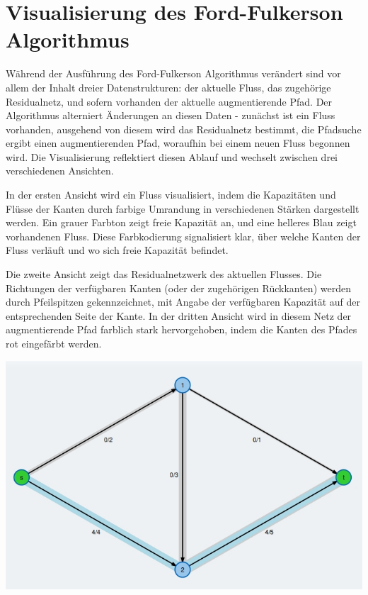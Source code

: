 \section{Visualisierung des Ford-Fulkerson Algorithmus}

Während der Ausführung des Ford-Fulkerson Algorithmus verändert sind vor allem der Inhalt dreier Datenstrukturen: der aktuelle Fluss, das zugehörige Residualnetz, und sofern vorhanden der aktuelle augmentierende Pfad. Der Algorithmus alterniert Änderungen an diesen Daten - zunächst ist ein Fluss vorhanden, ausgehend von diesem wird das Residualnetz bestimmt, die Pfadsuche ergibt einen augmentierenden Pfad, woraufhin bei einem neuen Fluss begonnen wird. Die Visualisierung reflektiert diesen Ablauf und wechselt zwischen drei verschiedenen Ansichten.

In der ersten Ansicht wird ein Fluss visualisiert, indem die Kapazitäten und Flüsse der Kanten durch farbige Umrandung in verschiedenen Stärken dargestellt werden. Ein grauer Farbton zeigt freie Kapazität an, und eine helleres Blau zeigt vorhandenen Fluss. Diese Farbkodierung signalisiert klar, über welche Kanten der Fluss verläuft und wo sich freie Kapazität befindet.

Die zweite Ansicht zeigt das Residualnetzwerk des aktuellen Flusses. Die Richtungen der verfügbaren Kanten (oder der zugehörigen Rückkanten) werden durch Pfeilspitzen gekennzeichnet, mit Angabe der verfügbaren Kapazität auf der entsprechenden Seite der Kante. In der dritten Ansicht wird in diesem Netz der augmentierende Pfad farblich stark hervorgehoben, indem die Kanten des Pfades rot eingefärbt werden.

\begin{center}
\begin{minipage}[t]{0.58\textwidth}
    \includegraphics[width=\textwidth]{img/ford-fulkerson-1.jpg}
\end{minipage}
\end{center}


